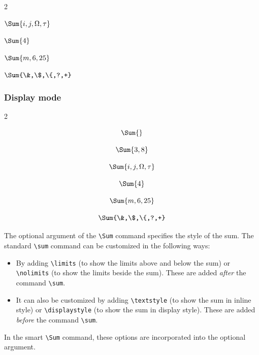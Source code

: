 \documentclass{article}
\begin{document}
{\begin{multicols}{2}
\begin{verbbox}
$\Sum{i,j,\Omega,\tau}$
\end{verbbox}
\begin{verbbox}
$\Sum{4}$
\end{verbbox}

\begin{verbbox}
$\Sum{m,6,25}$
\end{verbbox}

\begin{verbbox}
$\Sum{\&,\$,\{,?,+}$
\end{verbbox}
\end{multicols}

\subsubsection*{Display mode}

\begin{multicols}{2} %
\begin{verbbox}
$$\Sum{}$$
\end{verbbox}

\begin{verbbox}
$$\Sum{3,8}$$
\end{verbbox}

\begin{verbbox}
$$\Sum{i,j,\Omega,\tau}$$
\end{verbbox}
\begin{verbbox}
$$\Sum{4}$$
\end{verbbox}

\begin{verbbox}
$$\Sum{m,6,25}$$
\end{verbbox}

\begin{verbbox}
$$\Sum{\&,\$,\{,?,+}$$
\end{verbbox}
\end{multicols}

The optional argument of the \verb!\Sum! command specifies the style of the sum. The standard \verb!\sum! command can be customized in the following ways:
\begin{itemize}
    \item By adding \verb!\limits! (to show the limits above and below the sum) or \verb!\nolimits! (to show the limits beside the sum). These are added \emph{after} the command \verb!\sum!.
    \item It can also be customized by adding \verb!\textstyle! (to show the sum in inline style) or \verb!\displaystyle! (to show the sum in display style). These are added \emph{before} the command \verb!\sum!.
\end{itemize}
In the smart \verb!\Sum! command, these options are incorporated into the optional argument.\\

}
\end{document}
